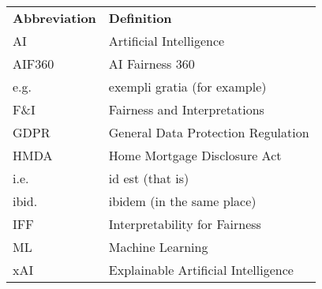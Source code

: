 \documentclass[
	12pt, 
	a4paper, 
	oneside,
	parskip=half*, %
	openany,  %
	listof=totoc, %
	bibliography=totoc, %
	index=totoc, %
  toc=chapterentrywithdots, %
  numbers=noenddot, %
]{scrbook}
\begin{document}
\setlength{\LTleft}{-0.45em}  %

\begin{longtable}{ll}
\large\textbf{Abbreviation} & \large\textbf{Definition} \\
AI & Artificial Intelligence \\
AIF360 & AI Fairness 360 \\
e.g. & exempli gratia (for example) \\
F\&I & Fairness and Interpretations \\
GDPR & General Data Protection Regulation \\
HMDA & Home Mortgage Disclosure Act \\
i.e. & id est (that is) \\
ibid. & ibidem (in the same place) \\
IFF & Interpretability for Fairness \\
ML & Machine Learning \\
xAI & Explainable Artificial Intelligence \\
\end{longtable}




\mainmatter
\setcounter{page}{1}



\printbibliography
\end{document}
